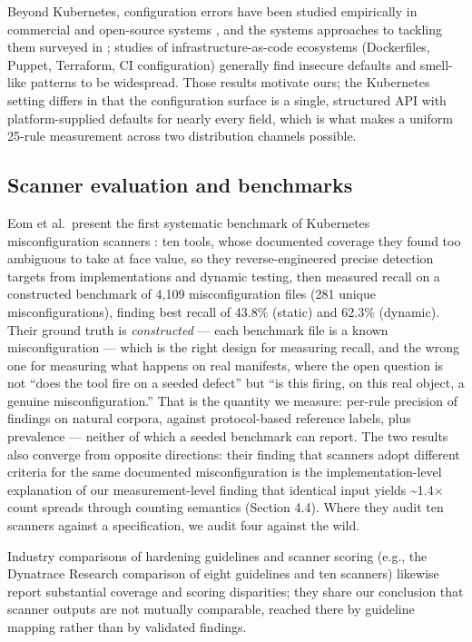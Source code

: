 \documentclass[pdflatex,sn-basic]{sn-jnl}
\begin{document}
Beyond Kubernetes, configuration errors have been studied empirically in
commercial and open-source systems \cite{Yin2011}, and the
systems approaches to tackling them surveyed in
\cite{XuZhou2015}; studies of infrastructure-as-code ecosystems
(Dockerfiles, Puppet, Terraform, CI configuration) generally find
insecure defaults and smell-like patterns to be widespread. Those
results motivate ours; the Kubernetes setting differs in that the
configuration surface is a single, structured API with platform-supplied
defaults for nearly every field, which is what makes a uniform 25-rule
measurement across two distribution channels possible.

\hypertarget{scanner-evaluation-and-benchmarks}{%
\subsection{Scanner evaluation and
benchmarks}\label{scanner-evaluation-and-benchmarks}}

Eom et al.~present the first systematic benchmark of Kubernetes
misconfiguration scanners \cite{Eom2026}: ten tools, whose
documented coverage they found too ambiguous to take at face value, so
they reverse-engineered precise detection targets from implementations
and dynamic testing, then measured recall on a constructed benchmark of
4,109 misconfiguration files (281 unique misconfigurations), finding
best recall of 43.8\% (static) and 62.3\% (dynamic). Their ground truth
is \emph{constructed} --- each benchmark file is a known
misconfiguration --- which is the right design for measuring recall, and
the wrong one for measuring what happens on real manifests, where the
open question is not ``does the tool fire on a seeded defect'' but ``is
this firing, on this real object, a genuine misconfiguration.'' That is
the quantity we measure: per-rule precision of findings on natural
corpora, against protocol-based reference labels, plus prevalence ---
neither of which a seeded benchmark can report. The two results also converge from
opposite directions: their finding that scanners adopt different
criteria for the same documented misconfiguration is the
implementation-level explanation of our measurement-level finding that
identical input yields \textasciitilde1.4$\times$ count spreads through
counting semantics (Section 4.4). Where they audit ten scanners against
a specification, we audit four against the wild.

Industry comparisons of hardening guidelines and scanner scoring (e.g.,
the Dynatrace Research comparison of eight guidelines and ten scanners)
likewise report substantial coverage and scoring disparities; they share
our conclusion that scanner outputs are not mutually comparable, reached
there by guideline mapping rather than by validated findings.
\end{document}
